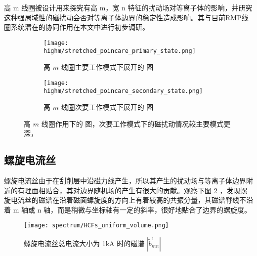 高 m 线圈被设计用来探究有高 m，宽 n 特征的扰动场对等离子体的影响，并研究这种强局域性的磁扰动会否对等离子体边界的稳定性造成影响。其与目前RMP线圈系统潜在的协同作用在本文中进行初步调研。



\begin{figure}[htbp]
  \centering%
  \begin{subfigure}{0.8\textwidth}
      \texttt{[image: highm/stretched\_poincare\_primary\_state.png]}
      \caption{高 $m$ 线圈主要工作模式下展开的 \Poincare 图}
  \end{subfigure}
  \begin{subfigure}{0.8\textwidth}
      \texttt{[image: highm/stretched\_poincare\_secondary\_state.png]}
      \caption{高 $m$ 线圈次要工作模式下展开的 \Poincare 图}
  \end{subfigure}
  \caption{高 $m$ 线圈作用下的 \Poincare 图，次要工作模式下的磁扰动情况较主要模式更深，\cite{zhang_highm} }
  \label{fig:highm-stretched-poincare}
\end{figure}


\subsection{螺旋电流丝}

螺旋电流丝由于在刮削层中沿磁力线产生，所以其产生的扰动场与等离子体边界附近的有理面相贴合，其对边界随机场的产生有很大的贡献。观察下图 \ref{fig:HCFs-b1_tilde} ，发现螺旋电流丝的磁谱在沿着磁面螺旋度的方向上有着较高的共振分量，其磁谱脊线不沿着 m 轴或 n 轴，而是稍微与坐标轴有一定的斜率，很好地贴合了边界的螺旋度。

\begin{figure}[htbp]
  \label{fig:HCFs-b1_tilde}
  \centering%
      \texttt{[image: spectrum/HCFs\_uniform\_volume.png]}
      \caption{螺旋电流丝总电流大小为 1kA 时的磁谱 $|\tilde{b}^1_{mn}|$ }
\end{figure}
